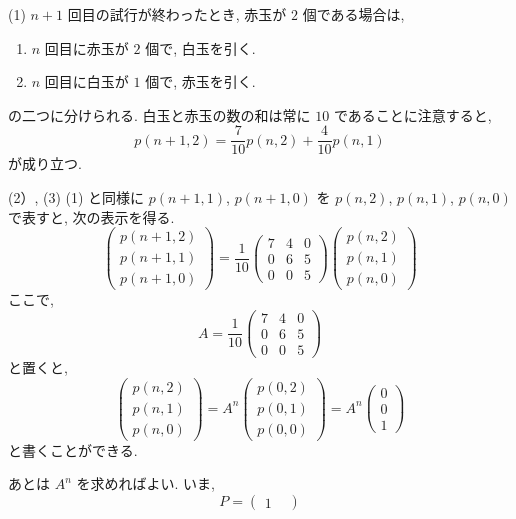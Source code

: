 \documentclass[main]{subfiles}
\begin{document}
\begin{pf}
(1) $n+1$ 回目の試行が終わったとき, 赤玉が $2$ 個である場合は,
\begin{enumerate}
\item $n$ 回目に赤玉が $2$ 個で, 白玉を引く.
\item $n$ 回目に白玉が $1$ 個で, 赤玉を引く.
\end{enumerate}
の二つに分けられる. 
白玉と赤玉の数の和は常に $10$ であることに注意すると, 
\begin{equation*}
p(n+1, 2) = \frac{7}{10}p(n,2) + \frac{4}{10}p(n,1)
\end{equation*}
が成り立つ.

(2）, (3) 
(1) と同様に $p(n+1,1)$, $p(n+1,0)$ を $p(n,2)$, $p(n,1)$, $p(n,0)$ で表すと, 
次の表示を得る.
\begin{equation*}
\begin{pmatrix}
p(n+1,2) \\
p(n+1,1) \\
p(n+1,0)
\end{pmatrix} 
= \frac{1}{10}
\begin{pmatrix}
7 & 4 & 0 \\
0 & 6 & 5 \\
0 & 0 & 5
\end{pmatrix}
\begin{pmatrix}
p(n,2) \\
p(n,1) \\
p(n,0)
\end{pmatrix}
\end{equation*}
ここで, 
\begin{equation*}
A =  \frac{1}{10}
\begin{pmatrix}
7 & 4 & 0 \\
0 & 6 & 5 \\
0 & 0 & 5
\end{pmatrix}
\end{equation*}
と置くと, 
\begin{equation*}
\begin{pmatrix}
p(n,2) \\
p(n,1) \\
p(n,0)
\end{pmatrix} 
= A^n
\begin{pmatrix}
p(0,2) \\
p(0,1) \\
p(0,0)
\end{pmatrix} 
= A^n
\begin{pmatrix}
0 \\
0\\
1
\end{pmatrix} 
\end{equation*}
と書くことができる.

あとは $A^n$ を求めればよい.
いま, 
\begin{equation*}
P = 
\begin{pmatrix}
1 & 
\end{pmatrix} 
\end{equation*}
\end{pf}
\end{document}
